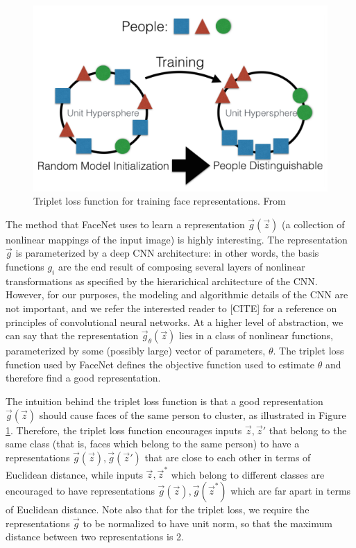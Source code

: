 \begin{figure}
\centering
\includegraphics[scale = 0.5]{Figures/triplet_loss.png}
\caption{Triplet loss function for training face representations.  From \cite{amos2016openface}}
\label{fig:triplet_loss}
\end{figure}

The method that FaceNet uses to learn a representation
$\vec{g}(\vec{z})$ (a collection of nonlinear mappings of the input
image) is highly interesting.  The representation $\vec{g}$ is
parameterized by a deep CNN architecture: in other words, the basis
functions $g_i$ are the end result of composing several layers of
nonlinear transformations as specified by the hierarichical
architecture of the CNN.  However, for our purposes, the modeling and
algorithmic details of the CNN are not important, and we refer the
interested reader to [CITE] for a reference on principles of
convolutional neural networks.  At a higher level of abstraction, we
can say that the representation $\vec{g}_\theta(\vec{z})$ lies in a
class of nonlinear functions, parameterized by some (possibly large)
vector of parameters, $\theta$.  The triplet loss function used by
FaceNet defines the objective function used to estimate $\theta$ and
therefore find a good representation.

The intuition behind the triplet loss function is that a good
representation $\vec{g}(\vec{z})$ should cause faces of the same
person to cluster, as illustrated in Figure \ref{fig:triplet_loss}.
Therefore, the triplet loss function encourages inputs $\vec{z},
\vec{z}'$ that belong to the same class (that is, faces which belong
to the same person) to have a representations $\vec{g}(\vec{z}),
\vec{g}(\vec{z}')$ that are close to each other in terms of Euclidean
distance, while inputs $\vec{z}, \vec{z}^*$ which belong to different
classes are encouraged to have representations $\vec{g}(\vec{z}),
\vec{g}(\vec{z}^*)$ which are far apart in terms of Euclidean
distance.  Note also that for the triplet loss, we require the
representations $\vec{g}$ to be normalized to have unit norm, so that
the maximum distance between two representations is 2.

